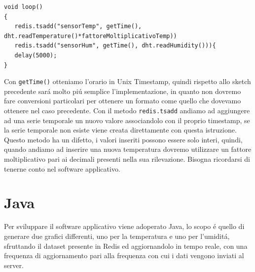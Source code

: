 \begin{enumerate}
\begin{lstlisting}[autogobble]
void loop()
{
   redis.tsadd("sensorTemp", getTime(), dht.readTemperature()*fattoreMoltiplicativoTemp))
   redis.tsadd("sensorHum", getTime(), dht.readHumidity())){
   delay(5000);
}\end{lstlisting}

    Con \texttt{getTime()} otteniamo l'orario in Unix Timestamp, quindi rispetto allo sketch precedente
    sará molto piú semplice l'implementazione, in quanto non dovremo fare conversioni particolari per ottenere
    un formato come quello che dovevamo ottenere nel caso precedente.
    Con il metodo \texttt{redis.tsadd} andiamo ad aggiungere ad una serie temporale un nuovo valore associandolo con il proprio timestamp,
    se la serie temporale non esiste viene creata direttamente con questa istruzione.
    Questo metodo ha un difetto, i valori inseriti possono essere solo interi, quindi, quando andiamo ad inserire
    una nuova temperatura dovremo utilizzare un fattore moltiplicativo pari ai decimali presenti nella sua rilevazione.
    Bisogna ricordarsi di tenerne conto nel software applicativo.
\end{enumerate}


\section{Java}
Per sviluppare il software applicativo viene adoperato Java, lo scopo é quello di generare due grafici differenti,
uno per la temperatura e uno per l'umiditá, sfruttando il dataset presente in Redis ed aggiornandolo in tempo reale, con
una frequenza di aggiornamento pari alla frequenza con cui i dati vengono inviati al server.

